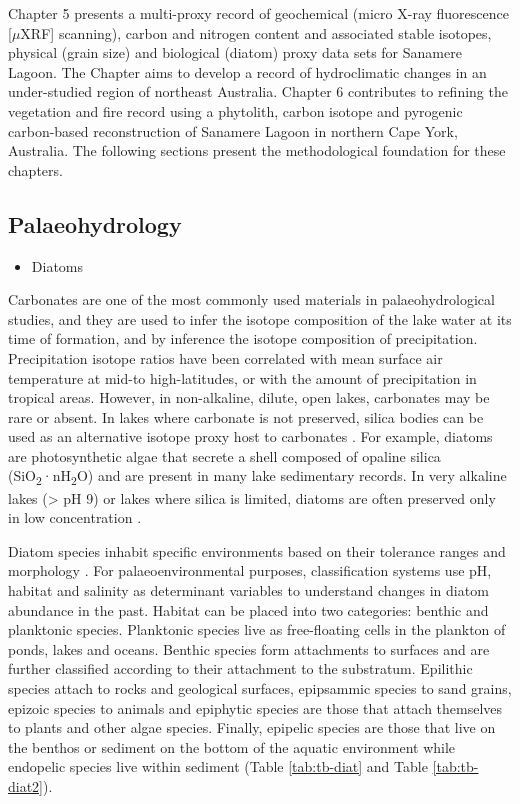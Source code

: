 \documentclass[
  12pt,
]{book}
\providecommand{\tightlist}{%
  \setlength{\itemsep}{0pt}\setlength{\parskip}{0pt}}
\begin{document}
Chapter 5 presents a multi-proxy record of geochemical (micro X-ray fluorescence {[}\(\mu\)XRF{]} scanning), carbon and nitrogen content and associated stable isotopes, physical (grain size) and biological (diatom) proxy data sets for Sanamere Lagoon. The Chapter aims to develop a record of hydroclimatic changes in an under-studied region of northeast Australia. Chapter 6 contributes to refining the vegetation and fire record using a phytolith, carbon isotope and pyrogenic carbon-based reconstruction of Sanamere Lagoon in northern Cape York, Australia. The following sections present the methodological foundation for these chapters.

\hypertarget{palaeohydrology}{%
\subsection{Palaeohydrology}\label{palaeohydrology}}

\begin{itemize}
\tightlist
\item
  Diatoms
\end{itemize}

Carbonates are one of the most commonly used materials in palaeohydrological studies, and they are used to infer the isotope composition of the lake water at its time of formation, and by inference the isotope composition of precipitation. Precipitation isotope ratios have been correlated with mean surface air temperature at mid-to high-latitudes, or with the amount of precipitation in tropical areas. However, in non-alkaline, dilute, open lakes, carbonates may be rare or absent. In lakes where carbonate is not preserved, silica bodies can be used as an alternative isotope proxy host to carbonates \citep{huBiogenicsilicaD18ORecord2003, lambComparisonPalaeoclimateSignals2005}. For example, diatoms are photosynthetic algae that secrete a shell composed of opaline silica (SiO\textsubscript{2}·nH\textsubscript{2}O) and are present in many lake sedimentary records. In very alkaline lakes (\textgreater{} pH 9) or lakes where silica is limited, diatoms are often preserved only in low concentration \citep{barkerExperimentalDissolutionDiatom1994}.

Diatom species inhabit specific environments based on their tolerance ranges and morphology \citep{battarbeeDiatoms2002}. For palaeoenvironmental purposes, classification systems use pH, habitat and salinity as determinant variables to understand changes in diatom abundance in the past. Habitat can be placed into two categories: benthic and planktonic species. Planktonic species live as free-floating cells in the plankton of ponds, lakes and oceans. Benthic species form attachments to surfaces and are further classified according to their attachment to the substratum. Epilithic species attach to rocks and geological surfaces, epipsammic species to sand grains, epizoic species to animals and epiphytic species are those that attach themselves to plants and other algae species. Finally, epipelic species are those that live on the benthos or sediment on the bottom of the aquatic environment while endopelic species live within sediment \citep{battarbeeDiatoms2002} (Table \ref{tab:tb-diat} and Table \ref{tab:tb-diat2}).
\end{document}
